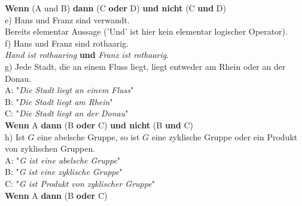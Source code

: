 \textbf{Wenn} (A und B) \textbf{dann} (C \textbf{oder} D) \textbf{und nicht} (C \textbf{und} D)\\

e) Hans und Franz sind verwandt.\\

Bereits elementar Aussage ('Und' ist hier kein elementar logischer Operator).\\

f) Hans und Franz sind rothaarig.\\

\textit{Hand ist rothaaring} \textbf{und} \textit{Franz ist rothaarig}.\\

g) Jede Stadt, die an einem Fluss liegt, liegt entweder am Rhein oder an der Donau.\\

A: "\textit{Die Stadt liegt an einem Fluss}"\\
B: "\textit{Die Stadt liegt am Rhein}"\\
C: "\textit{Die Stadt liegt an der Donau}"\\

\textbf{Wenn} A \textbf{dann} (B \textbf{oder} C) \textbf{und nicht} (B \textbf{und} C)\\

h) Ist $G$ eine abelsche Gruppe, so ist $G$ eine zyklische Gruppe oder ein Produkt von zyklischen Gruppen.\\

A: "\textit{G ist eine abelsche Gruppe}"\\
B: "\textit{G ist eine zyklische Gruppe}"\\
C: "\textit{G ist Produkt von zyklischer Gruppe}"\\

\textbf{Wenn} A \textbf{dann} (B \textbf{oder} C)

